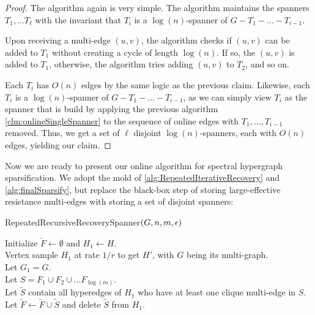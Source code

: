 \documentclass{article}
\begin{document}
\begin{proof}
    The algorithm again is very simple. The algorithm maintains the spanners $T_1, \dots T_{\ell}$ with the invariant that $T_i$ is a $\log(n)$-spanner of $G - T_1 - \dots - T_{i-1}$. 

    Upon receiving a multi-edge $(u,v)$, the algorithm checks if $(u,v)$ can be added to $T_1$ without creating a cycle of length $\log(n)$. If so, the $(u,v)$ is added to $T_1$, otherwise, the algorithm tries adding $(u,v)$ to $T_2$, and so on.

    Each $T_i$ has $O(n)$ edges by the same logic as the previous claim. Likewise, each $T_i$ is a $\log(n)$-spanner of $G - T_1 - \dots - T_{i-1}$, as we can simply view $T_i$ as the spanner that is build by applying the previous algorithm \cref{clm:onlineSingleSpanner} to the sequence of online edges with $T_1, \dots, T_{i-1}$ removed. Thus, we get a set of $\ell$ disjoint $\log(n)$-spanners, each with $O(n)$ edges, yielding our claim. 
\end{proof}

Now we are ready to present our online algorithm for spectral hypergraph sparsification. We adopt the mold of \cref{alg:RepeatedIterativeRecovery} and \cref{alg:finalSparsify}, but replace the black-box step of storing large-effective resistance multi-edges with storing a set of disjoint spanners:

\begin{algorithm}[H]
    \caption{RepeatedRecursiveRecoverySpanner$(G, n, m, \epsilon)$}\label{alg:RepeatedIterativeRecoverySpanner}
    Initialize $\widetilde{F} \gets \emptyset$ and $H_1 \gets H$.\\
     {
    Vertex sample $H_1$ at rate $1/r$ to get $H'$, with $G$ being its multi-graph.\\ 
    Let $G_1 = G$. \\
    Let $S =  F_1 \cup F_2 \cup \dots F_{\log(m)}$.\\
    Let $\widetilde{S}$
    contain all hyperedges of $H_1$ who have at least one
    clique multi-edge in $S$. \\
    Let $\widetilde{F} \gets \widetilde{F} \cup \widetilde{S}$ and delete $\widetilde{S}$ from $H_1$.
    }
\end{algorithm}
\end{document}
